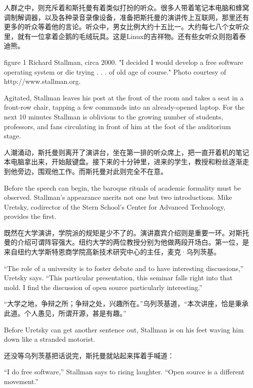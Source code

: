 \ifdefined\chs
人群之中，则充斥着和斯托曼有着类似打扮的听众。很多人带着笔记本电脑和蜂窝调制解调器，以及各种录音录像设备，准备把斯托曼的演讲传上互联网，那里还有更多的听众等着他的言论。听众中，男女比例大约十五比一。大约每七八个女听众里，就有一位拿着企鹅的毛绒玩具。这是Linux的吉祥物。还有些女听众则抱着泰迪熊。
\fi

\ifdefined\eng
figure 1
Richard Stallman, circa 2000. "I decided I would develop a free software operating system or die trying . . . of old age of course." Photo courtesy of http://www.stallman.org.
\fi

\ifdefined\eng
Agitated, Stallman leaves his post at the front of the room and takes a seat in a front-row chair, tapping a few commands into an already-opened laptop. For the next 10 minutes Stallman is oblivious to the growing number of students, professors, and fans circulating in front of him at the foot of the auditorium stage.
\fi

\ifdefined\chs
人潮涌动，斯托曼则离开了演讲台，坐在第一排的听众席上，把一直开着机的笔记本电脑拿出来，开始敲键盘。接下来的十分钟里，进来的学生，教授和粉丝逐渐走到他旁边，围观他工作。而斯托曼对此则完全不在意。
\fi

\ifdefined\eng
Before the speech can begin, the baroque rituals of academic formality must be observed. Stallman's appearance merits not one but two introductions. Mike Uretsky, codirector of the Stern School's Center for Advanced Technology, provides the first.
\fi

\ifdefined\chs
既然在大学演讲，学院派的规矩是少不了的。演讲嘉宾介绍则是重要一环。对斯托曼的介绍可谓阵容强大。纽约大学的两位教授分别为他做两段开场白。第一位，是来自纽约大学斯特恩商学院高新技术研究中心的主任，麦克·乌列茨基。
\fi

\ifdefined\eng
``The role of a university is to foster debate and to have interesting discussions,'' Uretsky says. ``This particular presentation, this seminar falls right into that mold. I find the discussion of open source particularly interesting.''
\fi

\ifdefined\chs
``大学之地，争辩之所；争辩之处，兴趣所在。''乌列茨基道，``本次讲座，恰是秉承此道。个人愚见，所谓开源，甚是有趣。''
\fi

\ifdefined\eng
Before Uretsky can get another sentence out, Stallman is on his feet waving him down like a stranded motorist.
\fi

\ifdefined\chs
还没等乌列茨基把话说完，斯托曼就站起来挥着手喊道：
\fi

\ifdefined\eng
``I do free software,'' Stallman says to rising laughter. ``Open source is a different movement.''
\fi

